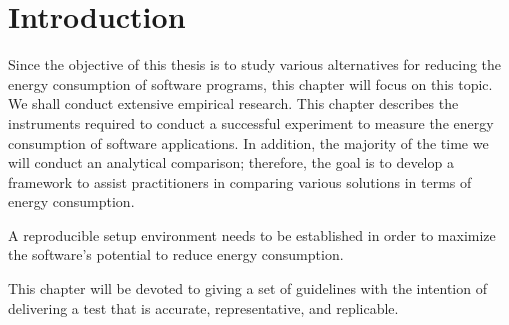
\section{Introduction}
Since the objective of this thesis is to study various alternatives for reducing the energy consumption of software programs, this chapter will focus on this topic. We shall conduct extensive empirical research. This chapter describes the instruments required to conduct a successful experiment to measure the energy consumption of software applications.
In addition, the majority of the time we will conduct an analytical comparison; therefore, the goal is to develop a framework to assist practitioners in comparing various solutions in terms of energy consumption.



A reproducible setup environment needs to be established in order to maximize the software's potential to reduce energy consumption.

This chapter will be devoted to giving a set of guidelines with the intention of delivering a test that is accurate, representative, and replicable.













